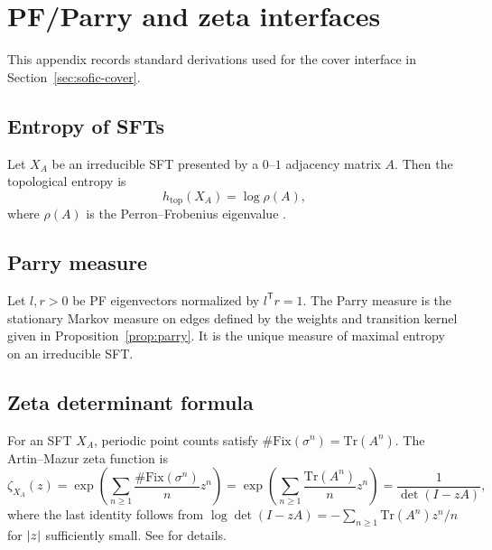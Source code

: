\section{PF/Parry and zeta interfaces}\label{app:pf-parry-zeta}

This appendix records standard derivations used for the cover interface in Section~\ref{sec:sofic-cover}.

\subsection{Entropy of SFTs}\label{app:sft-entropy}
Let $X_A$ be an irreducible SFT presented by a $0$--$1$ adjacency matrix $A$.
Then the topological entropy is
\[
h_{\mathrm{top}}(X_A)=\log\rho(A),
\]
where $\rho(A)$ is the Perron--Frobenius eigenvalue \cite{LindMarcus1995,Kitchens1998SymbolicDynamics}.

\subsection{Parry measure}\label{app:parry-measure}
Let $l,r>0$ be PF eigenvectors normalized by $l^{\mathsf T}r=1$.
The Parry measure is the stationary Markov measure on edges defined by the weights and transition kernel given in Proposition~\ref{prop:parry}.
It is the unique measure of maximal entropy on an irreducible SFT.

\subsection{Zeta determinant formula}\label{app:zeta-det}
For an SFT $X_A$, periodic point counts satisfy $\#\mathrm{Fix}(\sigma^n)=\mathrm{Tr}(A^n)$.
The Artin--Mazur zeta function is
\[
\zeta_{X_A}(z)=\exp\!\left(\sum_{n\ge 1}\frac{\#\mathrm{Fix}(\sigma^n)}{n}z^n\right)
=\exp\!\left(\sum_{n\ge 1}\frac{\mathrm{Tr}(A^n)}{n}z^n\right)
=\frac{1}{\det(I-zA)},
\]
where the last identity follows from $\log\det(I-zA)=-\sum_{n\ge 1}\mathrm{Tr}(A^n)z^n/n$ for $\left\lvert z\right\rvert$ sufficiently small.
See \cite{LindMarcus1995} for details.

